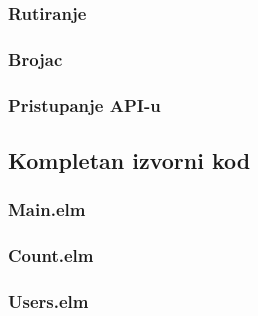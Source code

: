 \documentclass{viser-thesis}
\begin{document}
\subsubsection{Rutiranje}
\subsubsection{Brojac}
\subsubsection{Pristupanje API-u}

\subsection{Kompletan izvorni kod}

\subsubsection{Main.elm}


\subsubsection{Count.elm}


\subsubsection{Users.elm}


\newpage

\printindex
\newpage

\printbibliography[heading=bibintoc]
\end{document}
